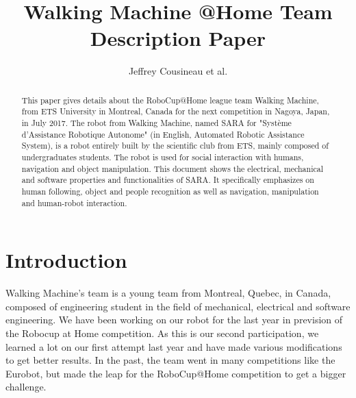 \documentclass[runningheads,a4paper]{llncs}
\begin{document}
\title{Walking Machine @Home \newline {} Team Description Paper}

\author{Jeffrey Cousineau et al.}
\maketitle



\begin{abstract}

This paper gives details about the RoboCup@Home league team Walking Machine, from ETS University in Montreal, Canada for the next competition in Nagoya, Japan, in July 2017. The robot from Walking Machine, named SARA for "Système d’Assistance Robotique Autonome" (in English, Automated Robotic Assistance System), is a robot entirely built by the scientific club from ETS, mainly composed of undergraduates students. The robot is used for social interaction with humans, navigation and object manipulation. This document shows the electrical, mechanical and software properties and functionalities of SARA. It specifically emphasizes on human following, object and people recognition as well as navigation, manipulation and human-robot interaction.

\end{abstract}


\section{Introduction}
\tab Walking Machine’s team is a young team from Montreal, Quebec, in Canada, composed of engineering student in the field of mechanical, electrical and software engineering. We have been working on our robot for the last year in prevision of the Robocup at Home competition. As this is our second participation, we learned a lot on our first attempt last year and have made various modifications to get better results. In the past, the team went in many competitions like the Eurobot, but made the leap for the RoboCup@Home competition to get a bigger challenge. \\
\end{document}
